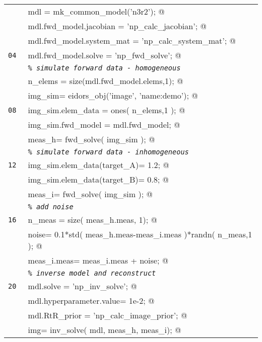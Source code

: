 \documentclass[12pt]{iopart}
\makeatletter
\newcommand{\CODEstart}{\medskip\begin{tabular}{ll}}
\newcommand{\CN}{\tt\scriptsize} %
\newcommand{\CC}{&\small\verb@}   % start code
\newcommand{\CI}{&\small\tt\em}   % start code
\newcommand{\CODEend}{\end{tabular}\medskip}
\makeatother
\begin{document}
\CODEstart
\CN    \CC mdl  = mk_common_model('n3r2');   @\\[-3pt]
\CN    \CC mdl.fwd_model.jacobian   = 'np_calc_jacobian';   @\\[-3pt]
\CN    \CC mdl.fwd_model.system_mat = 'np_calc_system_mat';   @\\[-3pt]
\CN 04 \CC mdl.fwd_model.solve      = 'np_fwd_solve';   @\\[-3pt]
\CN    \CI \% simulate forward data - homogeneous \\[-3pt]
\CN    \CC n_elems = size(mdl.fwd_model.elems,1);   @\\[-3pt]
\CN    \CC img_sim= eidors_obj('image', 'name:demo');   @\\[-3pt]
\CN 08 \CC img_sim.elem_data = ones( n_elems,1 );    @\\[-3pt]
\CN    \CC img_sim.fwd_model = mdl.fwd_model;   @\\[-3pt]
\CN    \CC meas_h= fwd_solve( img_sim );   @\\[-3pt]
\CN    \CI \% simulate forward data - inhomogeneous \\[-3pt]
\CN 12 \CC img_sim.elem_data(target_A)= 1.2;   @\\[-3pt]
\CN    \CC img_sim.elem_data(target_B)= 0.8;   @\\[-3pt]
\CN    \CC meas_i= fwd_solve( img_sim );   @\\[-3pt]
\CN    \CI \% add noise \\[-3pt]
\CN 16 \CC n_meas = size( meas_h.meas, 1); @\\[-3pt]
\CN    \CC noise= 0.1*std( meas_h.meas-meas_i.meas )*randn( n_meas,1 ); @\\[-3pt]
\CN    \CC meas_i.meas= meas_i.meas + noise; @\\[-3pt]
\CN    \CI \% inverse model and reconstruct\\[-3pt]
\CN 20 \CC mdl.solve               = 'np_inv_solve'; @\\[-3pt]
\CN    \CC mdl.hyperparameter.value= 1e-2; @\\[-3pt]
\CN    \CC mdl.RtR_prior           = 'np_calc_image_prior'; @\\[-3pt]
\CN    \CC img= inv_solve( mdl, meas_h, meas_i); @\\[-3pt]
\CODEend

%
%
\begin{figure}[th]
\end{figure}
\end{document}
